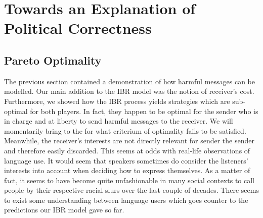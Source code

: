 \documentclass[10]{article}
\begin{document}
\begin{comment}
Starting from Spence's seminal "Job Market Signalling", much has been written about games where by sending a message an agent causes a cost. This is the core of so-called \textit{costly signalling games}. Particularly economic theory has been interested in this twist of the Lewisian signaling model.\\
Common assumptions here are that the message's meaning is determined before the start of the game and that sender's cost vector is common knowledge, which, in turn, allows the receiver to distinguish credible and non-credible signals.\\


\begin{table}[h]
\centering
\begin{tabular}{lllll}
States & Cost Sender & Messages & {Cost Receiver} & {Actions} \\ 
$t_1$  & c           & $m_1$    & 0                                  & $a_1$                        \\
$t_2$  & c           & $m_2$    & 0                                  & $a_2$                       
\end{tabular}
\end{table} 
\end{comment}

\section{Towards an Explanation of Political Correctness}
\subsection{Pareto Optimality}
The previous section contained a demonstration of how harmful messages can be modelled. Our main addition to the IBR model was the notion of receiver's cost. Furthermore, we showed how the IBR process yields strategies which are sub-optimal for both players. In fact, they happen to be optimal for the sender who is in charge and at liberty to send harmful messages to the receiver. We will momentarily bring to the for what criterium of optimality fails to be satisfied. Meanwhile, the receiver's interests are not directly relevant for sender the sender and therefore easily discarded. This seems at odds with real-life observations of language use. It would seem that speakers sometimes do consider the listeners' interests into account when deciding how to express themselves. As a matter of fact, it seems to have become quite unfashionable in many social contexts to call people by their respective racial slurs over the last couple of decades. There seems to exist some understanding between language users which goes counter to the predictions our IBR model gave so far.
\end{document}
